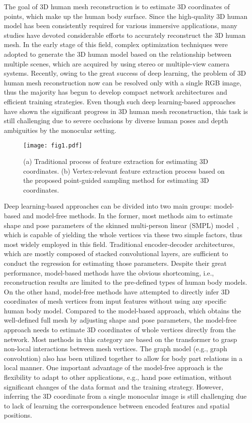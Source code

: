 \documentclass[10pt,twocolumn,letterpaper]{article}
\begin{document}
The goal of 3D human mesh reconstruction is to estimate 3D coordinates of points, which make up the human body surface. Since the high-quality 3D human model has been consistently required for various immersive applications, many studies have devoted considerable efforts to accurately reconstruct the 3D human mesh. In the early stage of this field, complex optimization techniques were adopted to generate the 3D human model based on the relationship between multiple scenes, which are acquired by using stereo or multiple-view camera systems. Recently, owing to the great success of deep learning, the problem of 3D human mesh reconstruction now can be resolved only with a single RGB image, thus the majority has begun to develop compact network architectures and efficient training strategies. Even though such deep learning-based approaches have shown the significant progress in 3D human mesh reconstruction, this task is still challenging due to severe occlusions by diverse human poses and depth ambiguities by the monocular setting.


\begin{figure}
\centering
\centerline{\texttt{[image: fig1.pdf]}}
\caption{\label{fig:sampling}
(a) Traditional process of feature extraction for estimating 3D coordinates. (b) Vertex-relevant feature extraction process based on the proposed point-guided sampling method for estimating 3D coordinates.}

\end{figure}


Deep learning-based approaches can be divided into two main groups: model-based and model-free methods. In the former, most methods aim to estimate shape and pose parameters of the skinned multi-person linear (SMPL) model~\cite{Loper15}, which is capable of yielding the whole vertices via these two simple factors, thus most widely employed in this field. Traditional encoder-decoder architectures, which are mostly composed of stacked convolutional layers, are sufficient to conduct the regression for estimating those parameters. Despite their great performance, model-based methods have the obvious shortcoming, i.e., reconstruction results are limited to the pre-defined types of human body models. On the other hand, model-free methods have attempted to directly infer 3D coordinates of mesh vertices from input features without using any specific human body model. Compared to the model-based approach, which obtains the well-defined full mesh by adjusting shape and pose parameters, the model-free approach needs to estimate 3D coordinates of whole vertices directly from the network. Most methods in this category are based on the transformer to grasp non-local interactions between mesh vertices. The graph model (e.g., graph convolution) also has been utilized together to allow for body part relations in a local manner. One important advantage of the model-free approach is the flexibility to adapt to other applications, e.g., hand pose estimation, without significant changes of the data format and the training strategy. However, inferring the 3D coordinate from a single monocular image is still challenging due to lack of learning the correspondence between encoded features and spatial positions.
\end{document}
